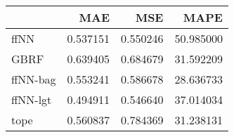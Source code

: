 \begin{tabular}{lrrr}
\toprule
{} &       MAE &       MSE &       MAPE \\
\midrule
ffNN     &  0.537151 &  0.550246 &  50.985000 \\
GBRF     &  0.639405 &  0.684679 &  31.592209 \\
ffNN-bag &  0.553241 &  0.586678 &  28.636733 \\
ffNN-lgt &  0.494911 &  0.546640 &  37.014034 \\
tope     &  0.560837 &  0.784369 &  31.238131 \\
\bottomrule
\end{tabular}
